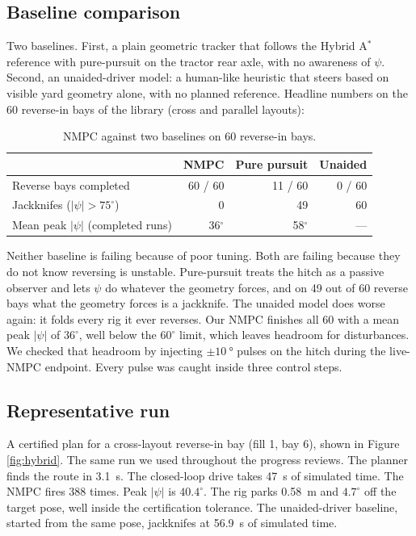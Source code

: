 \documentclass[conference]{IEEEtran}
\begin{document}
\subsection{Baseline comparison}

Two baselines. First, a plain geometric tracker that follows the Hybrid
A$^{*}$ reference with pure-pursuit on the tractor rear axle, with no
awareness of $\psi$. Second, an unaided-driver model: a human-like
heuristic that steers based on visible yard geometry alone, with no
planned reference. Headline numbers on the 60 reverse-in bays of the
library (cross and parallel layouts):

\begin{table}[t]
    \centering
    \caption{NMPC against two baselines on 60 reverse-in bays.}
    \label{tab:baselines}
    \footnotesize
    \setlength{\tabcolsep}{3pt}
    \begin{tabular}{@{}lrrr@{}}
        \toprule
         & NMPC & Pure pursuit & Unaided \\
        \midrule
        Reverse bays completed              & 60 / 60 & 11 / 60 & 0 / 60 \\
        Jackknifes ($|\psi| > 75^{\circ}$)  & 0       & 49      & 60     \\
        Mean peak $|\psi|$ (completed runs) & 36$^{\circ}$ & 58$^{\circ}$ & --- \\
        \bottomrule
    \end{tabular}
\end{table}

Neither baseline is failing because of poor tuning. Both are failing
because they do not know reversing is unstable. Pure-pursuit treats the
hitch as a passive observer and lets $\psi$ do whatever the geometry
forces, and on 49 out of 60 reverse bays what the geometry forces is a
jackknife. The unaided model does worse again: it folds every rig it
ever reverses. Our NMPC finishes all 60 with a mean peak $|\psi|$ of
$36^{\circ}$, well below the $60^{\circ}$ limit, which leaves headroom
for disturbances. We checked that headroom by injecting
$\pm \SI{10}{\degree}$ pulses on the hitch during the live-NMPC endpoint.
Every pulse was caught inside three control steps.

\subsection{Representative run}

A certified plan for a cross-layout reverse-in bay (fill 1, bay 6),
shown in Figure \ref{fig:hybrid}. The same run we used throughout the
progress reviews. The planner finds the route in \SI{3.1}{\second}. The
closed-loop drive takes \SI{47}{\second} of simulated time. The NMPC
fires 388 times. Peak $|\psi|$ is $40.4^{\circ}$. The rig parks
\SI{0.58}{\meter} and $4.7^{\circ}$ off the target pose, well inside the
certification tolerance. The unaided-driver baseline, started from the
same pose, jackknifes at \SI{56.9}{\second} of simulated time.
\end{document}
